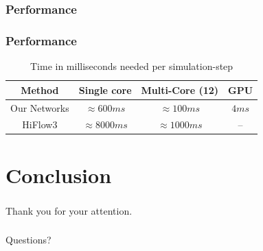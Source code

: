 \documentclass[18pt, xcolor=table]{beamer}
\begin{document}
\begin{frame}[t]
  \frametitle{Performance}  
\end{frame}

\begin{frame}[t]
  \frametitle{Performance}
  \vspace{1.5cm}
    \begin{center}
    \begin{table}
      \begin{tabular}{|c|c|c|c|}
        \hline
        \rowcolor{blue!50}
        \textbf{Method} & \textbf{Single core} & \textbf{Multi-Core (12)} & \textbf{GPU} \\
        \hline
        Our Networks    & $\approx 600ms$   & $\approx 100ms$  &  $4ms$ \\
        HiFlow3         & $\approx 8000ms$  & $\approx 1000ms$ & --  \\
        \hline
      \end{tabular}
      \caption{Time in milliseconds needed per simulation-step}
    \end{table}
  \end{center}
  
\end{frame}

\section{Conclusion}

\begin{frame}
  \frametitle{}
  \begin{center}
    \huge{Thank you for your attention.}
  \end{center}
\end{frame}

\begin{frame}
  \frametitle{}
  \begin{center}
    \huge{Questions?}
  \end{center}
\end{frame}
\end{document}
